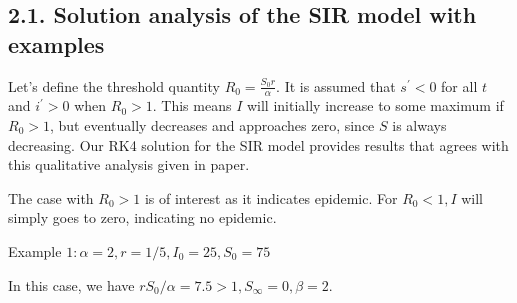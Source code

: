 \documentclass[10pt]{article}
\begin{document}
\subsection*{2.1. Solution analysis of the SIR model with examples}
Let's define the threshold quantity $R_{0}=\frac{S_{0} r}{\alpha}$. It is assumed that $s^{\prime}<0$ for all $t$ and $i^{\prime}>0$ when $R_{0}>1$. This means $I$ will initially increase to some maximum if $R_{0}>1$, but eventually decreases and approaches zero, since $S$ is always decreasing. Our RK4 solution for the SIR model provides results that agrees with this  qualitative analysis given in paper.

The case with $R_{0}>1$ is of interest as it indicates epidemic. For $R_{0}<1, I$ will simply goes to zero, indicating no epidemic. 

\vspace{2\baselineskip}
 Example $1: \alpha=2, r=1 / 5, I_{0}=25, S_{0}=75$


In this case, we have $r S_{0} / \alpha=7.5>1, S_{\infty}=0, \beta=2$. 
\end{document}
